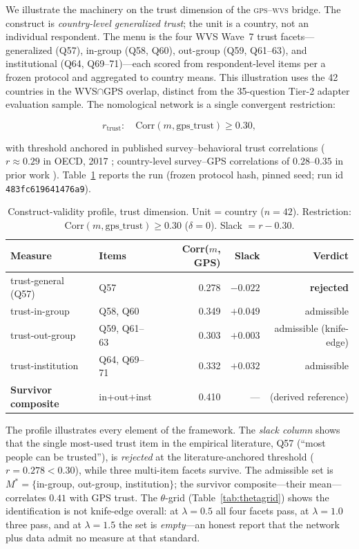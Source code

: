 \documentclass[11pt,letterpaper]{article}
\newcommand{\GPS}{\textsc{gps}}
\newcommand{\WVS}{\textsc{wvs}}
\begin{document}
We illustrate the machinery on the trust dimension of the \GPS{}--\WVS{} bridge. The construct is \emph{country-level generalized trust}; the unit is a country, not an individual respondent. The menu is the four WVS Wave~7 trust facets---generalized (Q57), in-group (Q58, Q60), out-group (Q59, Q61--63), and institutional (Q64, Q69--71)---each scored from respondent-level items per a frozen protocol and aggregated to country means. This illustration uses the 42 countries in the WVS$\cap$GPS overlap, distinct from the 35-question Tier-2 adapter evaluation sample. The nomological network is a single convergent restriction:

\begin{equation}
  r_{\mathrm{trust}}: \quad \mathrm{Corr}(m, \mathrm{gps\_trust}) \ge 0.30,
\end{equation}

with threshold anchored in published survey--behavioral trust correlations ($r \approx 0.29$ in OECD, 2017 \cite{oecd2017}; country-level survey--GPS correlations of $0.28$--$0.35$ in prior work \cite{falk2018}). Table~\ref{tab:p1_trust} reports the run (frozen protocol hash, pinned seed; run id \texttt{483fc619641476a9}).

\begin{table}[h!]
\centering
\caption{Construct-validity profile, trust dimension. Unit = country ($n=42$). Restriction: $\mathrm{Corr}(m, \text{gps\_trust}) \ge 0.30$ ($\delta=0$). Slack $= r - 0.30$.}
\label{tab:p1_trust}
\scriptsize
\begin{tabular}{@{}ll rrr@{}}
\toprule
\textbf{Measure} & \textbf{Items} & \textbf{Corr($m$, GPS)} & \textbf{Slack} & \textbf{Verdict} \\
\midrule
trust-general (Q57)      & Q57            & 0.278 & $-0.022$ & \textbf{rejected} \\
trust-in-group           & Q58, Q60       & 0.349 & $+0.049$ & admissible \\
trust-out-group          & Q59, Q61--63   & 0.303 & $+0.003$ & admissible (knife-edge) \\
trust-institution        & Q64, Q69--71   & 0.332 & $+0.032$ & admissible \\
\midrule
\textbf{Survivor composite} & in+out+inst  & 0.410 & ---     & (derived reference) \\
\bottomrule
\end{tabular}
\end{table}

The profile illustrates every element of the framework. The \emph{slack column} shows that the single most-used trust item in the empirical literature, Q57 (``most people can be trusted''), is \emph{rejected} at the literature-anchored threshold ($r=0.278 < 0.30$), while three multi-item facets survive. The admissible set is $M^* = \{$in-group, out-group, institution$\}$; the survivor composite---their mean---correlates $0.41$ with GPS trust. The $\theta$-grid (Table~\ref{tab:thetagrid}) shows the identification is not knife-edge overall: at $\lambda=0.5$ all four facets pass, at $\lambda=1.0$ three pass, and at $\lambda=1.5$ the set is \emph{empty}---an honest report that the network plus data admit no measure at that standard.
\end{document}
